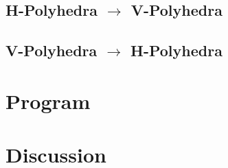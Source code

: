 \documentclass[a4,fleqn]{article}
\begin{document}
\subsection{H-Polyhedra $\to$ V-Polyhedra}
\subsection{V-Polyhedra $\to$ H-Polyhedra}

\section{Program}

\section{Discussion}
\end{document}
